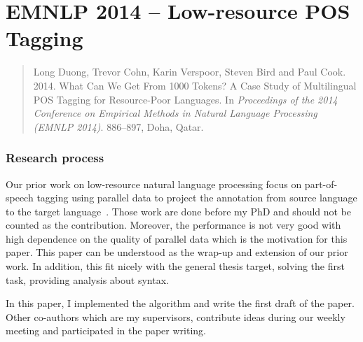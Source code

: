\documentclass[12pt,twoside,final,hidelinks]{ltthesis}
\theoremstyle{definition}
\begin{document}



\section{EMNLP 2014 -- Low-resource POS Tagging}
\label{sec:emnlp14}
\begin{quote}
Long Duong, Trevor Cohn, Karin Verspoor, Steven Bird and Paul Cook. 2014. What Can We Get From 1000 Tokens? A Case Study of Multilingual POS Tagging for Resource-Poor Languages. In \textit{Proceedings of the 2014 Conference on Empirical Methods in Natural Language Processing (EMNLP 2014)}. 886--897, Doha, Qatar.
\end{quote}
\subsubsection{Research process}
Our prior work on low-resource natural language processing focus on part-of-speech tagging using parallel data to project the annotation from source language 
to the target language~\cite{Duongacl13,duongIJCNLP}. Those work are done before my PhD and should not be counted as the contribution. Moreover, the performance 
is not very good with high dependence on the quality of parallel data which is the motivation for this paper. This paper can be understood as the wrap-up and extension of our prior work. In addition, this fit nicely with the general thesis target, solving the first task, providing analysis about syntax. 

In this paper, I implemented the algorithm and write the first draft of the paper. Other co-authors which are my supervisors, contribute ideas during our weekly 
meeting and participated in the paper writing. 
\end{document}
